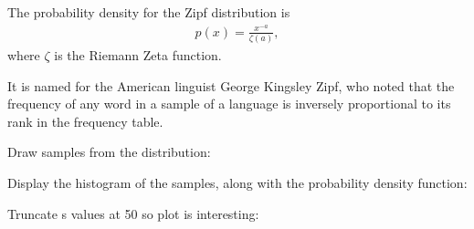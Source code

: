 \documentclass[letterpaper,10pt,english]{sphinxmanual}
\begin{document}
\begin{fulllineitems}
The probability density for the Zipf distribution is
\begin{equation*}
\begin{split}p(x) = \frac{x^{-a}}{\zeta(a)},\end{split}
\end{equation*}
where \(\zeta\) is the Riemann Zeta function.

It is named for the American linguist George Kingsley Zipf, who noted
that the frequency of any word in a sample of a language is inversely
proportional to its rank in the frequency table.

Draw samples from the distribution:

\begin{sphinxVerbatim}[commandchars=\\\{\}]
   
   
\end{sphinxVerbatim}

Display the histogram of the samples, along with
the probability density function:

\begin{sphinxVerbatim}[commandchars=\\\{\}]
   
     
\end{sphinxVerbatim}

Truncate s values at 50 so plot is interesting:

\begin{sphinxVerbatim}[commandchars=\\\{\}]
    \PYG{p}{[}\PYG{p}{]}  
   
      
     
\end{sphinxVerbatim}


\end{fulllineitems}
\end{document}

